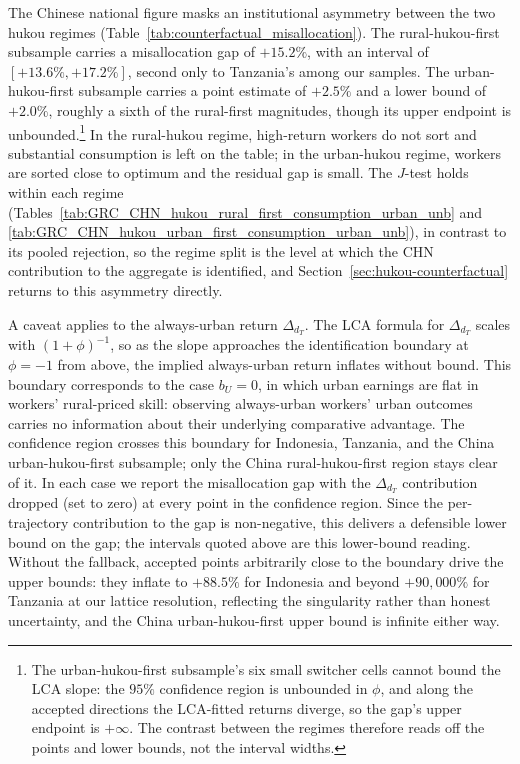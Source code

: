 \documentclass[12pt]{article}
\begin{document}
The Chinese national figure masks an institutional asymmetry between the two hukou regimes (Table~\ref{tab:counterfactual_misallocation}).
The rural-hukou-first subsample carries a misallocation gap of $+15.2\%$, with an interval of $[+13.6\%, +17.2\%]$, second only to Tanzania's among our samples.
The urban-hukou-first subsample carries a point estimate of $+2.5\%$ and a lower bound of $+2.0\%$, roughly a sixth of the rural-first magnitudes, though its upper endpoint is unbounded.\footnote{The urban-hukou-first subsample's six small switcher cells cannot bound the LCA slope: the $95\%$ confidence region is unbounded in $\phi$, and along the accepted directions the LCA-fitted returns diverge, so the gap's upper endpoint is $+\infty$. The contrast between the regimes therefore reads off the points and lower bounds, not the interval widths.}
In the rural-hukou regime, high-return workers do not sort and substantial consumption is left on the table; in the urban-hukou regime, workers are sorted close to optimum and the residual gap is small.
The $J$-test holds within each regime (Tables~\ref{tab:GRC_CHN_hukou_rural_first_consumption_urban_unb} and \ref{tab:GRC_CHN_hukou_urban_first_consumption_urban_unb}), in contrast to its pooled rejection, so the regime split is the level at which the CHN contribution to the aggregate is identified, and Section~\ref{sec:hukou-counterfactual} returns to this asymmetry directly.



A caveat applies to the always-urban return $\Delta_{d_T}$.
The LCA formula for $\Delta_{d_T}$ scales with $(1+\phi)^{-1}$, so as the slope approaches the identification boundary at $\phi = -1$ from above, the implied always-urban return inflates without bound.
This boundary corresponds to the case $b_U = 0$, in which urban earnings are flat in workers' rural-priced skill: observing always-urban workers' urban outcomes carries no information about their underlying comparative advantage.
The confidence region crosses this boundary for Indonesia, Tanzania, and the China urban-hukou-first subsample; only the China rural-hukou-first region stays clear of it.
In each case we report the misallocation gap with the $\Delta_{d_T}$ contribution dropped (set to zero) at every point in the confidence region.
Since the per-trajectory contribution to the gap is non-negative, this delivers a defensible lower bound on the gap; the intervals quoted above are this lower-bound reading.
Without the fallback, accepted points arbitrarily close to the boundary drive the upper bounds: they inflate to $+88.5\%$ for Indonesia and beyond $+90{,}000\%$ for Tanzania at our lattice resolution, reflecting the singularity rather than honest uncertainty, and the China urban-hukou-first upper bound is infinite either way.
\end{document}
